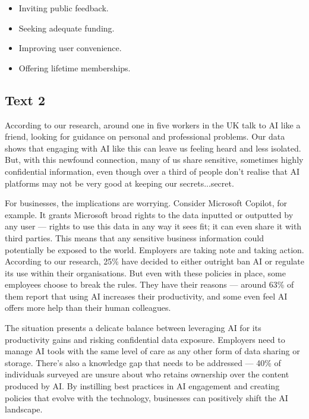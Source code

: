 \documentclass[UTF8,11pt]{ctexart}
\begin{document}
\begin{itemize}[leftmargin=2em,itemsep=.2em,topsep=.4em]\item[A.] Inviting public feedback.
\item[B.] Seeking adequate funding.
\item[C.] Improving user convenience.
\item[D.] Offering lifetime memberships.
\end{itemize}

\subsection*{\textbf{Text 2}}


According to our research, around one in five workers in the UK talk to AI like a friend, looking for guidance on personal and professional problems. Our data shows that engaging with AI like this can leave us feeling heard and less isolated. But, with this newfound connection, many of us share sensitive, sometimes highly confidential information, even though over a third of people don’t realise that AI platforms may not be very good at keeping our secrets...secret.


For businesses, the implications are worrying. Consider Microsoft Copilot, for example. It grants Microsoft broad rights to the data inputted or outputted by any user — rights to use this data in any way it sees fit; it can even share it with third parties. This means that any sensitive business information could potentially be exposed to the world. Employers are taking note and taking action. According to our research, 25\% have decided to either outright ban AI or regulate its use within their organisations. But even with these policies in place, some employees choose to break the rules. They have their reasons — around 63\% of them report that using AI increases their productivity, and some even feel AI offers more help than their human colleagues.


The situation presents a delicate balance between leveraging AI for its productivity gains and risking confidential data exposure. Employers need to manage AI tools with the same level of care as any other form of data sharing or storage. There’s also a knowledge gap that needs to be addressed — 40\% of individuals surveyed are unsure about who retains ownership over the content produced by AI. By instilling best practices in AI engagement and creating policies that evolve with the technology, businesses can positively shift the AI landscape.
\end{document}
